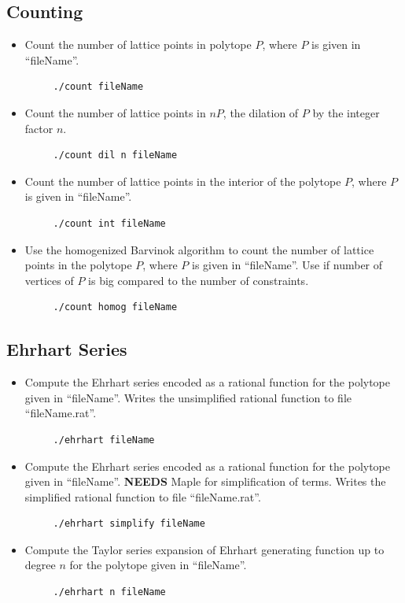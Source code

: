 \documentclass{article}
\begin{document}
\subsection{Counting}
\begin{itemize}
\item Count the number of lattice points in polytope $P$, where $P$
  is given in ``fileName''.
\begin{verbatim}
     ./count fileName
\end{verbatim} 
\item Count the number of lattice points in $nP$, the dilation of $P$
  by the integer factor $n$.
\begin{verbatim}
     ./count dil n fileName
\end{verbatim} 
\item Count the number of lattice points in the interior of the
  polytope $P$, where $P$ is given in ``fileName''.
\begin{verbatim}
     ./count int fileName
\end{verbatim} 
\item Use the homogenized Barvinok algorithm \cite{latte3} to count
  the number of lattice points in the polytope $P$, where $P$ is given
  in ``fileName''. Use if number of vertices of $P$ is big compared to
  the number of constraints. 
\begin{verbatim}
     ./count homog fileName
\end{verbatim} 
\end{itemize}



\subsection{Ehrhart Series}
\begin{itemize}
\item Compute the Ehrhart series encoded as a rational function for the
  polytope given in ``fileName''. Writes the unsimplified rational function
  to file ``fileName.rat''.
\begin{verbatim}
     ./ehrhart fileName
\end{verbatim} 
\item Compute the Ehrhart series encoded as a rational function for
  the polytope given in ``fileName''. {\bf NEEDS} Maple for
  simplification of terms. Writes the simplified rational function to
  file ``fileName.rat''. 
\begin{verbatim}
     ./ehrhart simplify fileName
\end{verbatim} 
\item Compute the Taylor series expansion of Ehrhart generating
  function up to degree $n$ for the polytope given in ``fileName''. 
\begin{verbatim}
     ./ehrhart n fileName
\end{verbatim} 
\end{itemize}
\end{document}

